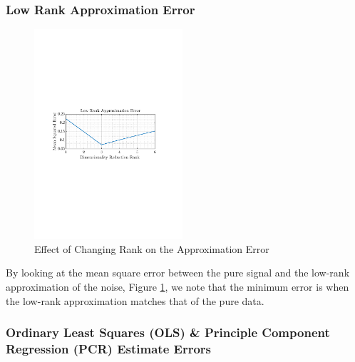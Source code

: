 \documentclass[12pt]{article}
\begin{document}
 	
 	\subsubsection{Low Rank Approximation Error}
	\begin{figure}[H]
 		\begin{centering}
 			\includegraphics[trim={2.2cm 11.2cm 3.15cm  11.2cm}, clip, width=0.49\textwidth]{../MATLAB/figures/q1_6b_fig01.pdf} 
 		\end{centering}
 		\captionsetup{justification=centering}
 		\caption{Effect of Changing Rank on the Approximation Error}
 		\label{fig: 1-6b}
 	\end{figure}
 
 	By looking at the mean square error between the pure signal and the low-rank approximation of the noise, Figure \ref{fig: 1-6b}, we note that the minimum error is when the low-rank approximation matches that of the pure data.

 	
 	\subsubsection{Ordinary Least Squares (OLS) \& Principle Component Regression (PCR)  Estimate Errors}
 	
\end{document}
